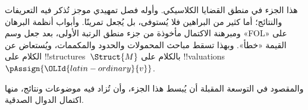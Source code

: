 \documentclass[../../include/open-logic-part]{subfiles}
\begin{document}

\begin{editorial}
  هذا الجزء في منطق القضايا الكلاسيكي. وأوله فصل تمهيدي موجز تُذكر فيه التعريفات والنتائج؛ أما كثير من البراهين فلا يُستوفى، بل يُجعل تمرينًا. وأبواب أنظمة البرهان ومبرهنة الاكتمال مأخوذة من جزء منطق الرتبة الأولى، بعد جعل وسم «FOL» على القيمة «خطأ». وبهذا تسقط مباحث المحمولات والحدود والمكممات، ويُستعاض عن الكلام على
  !!{structure}s~$\Struct{M}$ بالكلام على
  !!{valuation}s~$\pAssign{{\OLId{latin-ordinary}{v}}}$.

  والمقصود في التوسعة المقبلة أن يُبسط هذا الجزء، وأن تُزاد فيه موضوعات ونتائج، منها اكتمال الدوال الصدقية.
\end{editorial}










\OLEndPartHook
\end{document}
